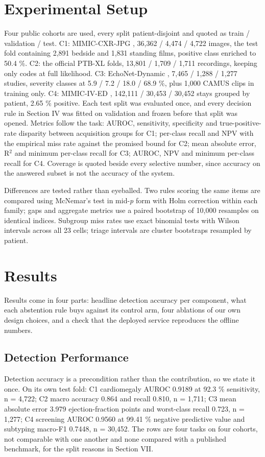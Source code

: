 \documentclass[conference,a4paper]{IEEEtran}
\begin{document}
\section{Experimental Setup}
Four public cohorts are used, every split patient-disjoint and quoted as train / validation / test. C1: MIMIC-CXR-JPG \cite{ref3}, 36,362 / 4,474 / 4,722 images, the test fold containing 2,891 bedside and 1,831 standing films, positive class enriched to 50.4 \%. C2: the official PTB-XL \cite{ref6} folds, 13,801 / 1,709 / 1,711 recordings, keeping only codes at full likelihood. C3: EchoNet-Dynamic \cite{ref7}, 7,465 / 1,288 / 1,277 studies, severity classes at 5.9 / 7.2 / 18.0 / 68.9 \%, plus 1,000 CAMUS \cite{ref9} clips in training only. C4: MIMIC-IV-ED \cite{ref13}, 142,111 / 30,453 / 30,452 stays grouped by patient, 2.65 \% positive. Each test split was evaluated once, and every decision rule in Section IV was fitted on validation and frozen before that split was opened. Metrics follow the task: AUROC, sensitivity, specificity and true-positive-rate disparity between acquisition groups \cite{ref16} for C1; per-class recall and NPV with the empirical miss rate against the promised bound for C2; mean absolute error, R$^{2}$ and minimum per-class recall for C3; AUROC, NPV and minimum per-class recall for C4. Coverage is quoted beside every selective number, since accuracy on the answered subset is not the accuracy of the system.

Differences are tested rather than eyeballed. Two rules scoring the same items are compared using McNemar's test \cite{ref26} in mid-\textit{p} form with Holm correction \cite{ref27} within each family; gaps and aggregate metrics use a paired bootstrap of 10,000 resamples on identical indices. Subgroup miss rates use exact binomial tests with Wilson intervals across all 23 cells; triage intervals are cluster bootstraps resampled by patient.

\section{Results}
Results come in four parts: headline detection accuracy per component, what each abstention rule buys against its control arm, four ablations of our own design choices, and a check that the deployed service reproduces the offline numbers.

\subsection{Detection Performance}
Detection accuracy is a precondition rather than the contribution, so we state it once. On its own test fold: C1 cardiomegaly AUROC 0.9189 at 92.3 \% sensitivity, n = 4,722; C2 macro accuracy 0.864 and recall 0.810, n = 1,711; C3 mean absolute error 3.979 ejection-fraction points and worst-class recall 0.723, n = 1,277; C4 screening AUROC 0.9560 at 99.41 \% negative predictive value and subtyping macro-F1 0.7448, n = 30,452. The rows are four tasks on four cohorts, not comparable with one another and none compared with a published benchmark, for the split reasons in Section VII.
\end{document}
